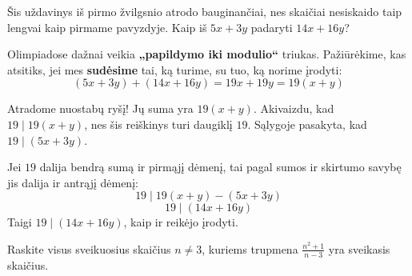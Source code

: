 \documentclass[11pt,a4paper]{scrartcl}
\begin{document}
\begin{solution}
Šis uždavinys iš pirmo žvilgsnio atrodo bauginančiai, nes skaičiai nesiskaido taip lengvai kaip pirmame pavyzdyje. Kaip iš \(5x + 3y\) padaryti \(14x + 16y\)? 

Olimpiadose dažnai veikia \textbf{„papildymo iki modulio“} triukas. 
Pažiūrėkime, kas atsitiks, jei mes \textbf{sudėsime} tai, ką turime, su tuo, ką norime įrodyti:
\begin{equation*} 
(5x + 3y) + (14x + 16y) = 19x + 19y = 19(x+y) 
\end{equation*}

Atradome nuostabų ryšį! Jų suma yra \(19(x+y)\). 
Akivaizdu, kad \(19 \mid 19(x+y)\), nes šis reiškinys turi daugiklį $19$.
Sąlygoje pasakyta, kad \(19 \mid (5x + 3y)\).

Jei $19$ dalija bendrą sumą ir pirmąjį dėmenį, tai pagal sumos ir skirtumo savybę jis dalija ir antrąjį dėmenį:
\begin{equation*} 
19 \mid 19(x+y) - (5x + 3y) 
\end{equation*}
\begin{equation*} 
19 \mid (14x + 16y) 
\end{equation*}
Taigi \(19\mid(14x+16y)\), kaip ir reikėjo įrodyti.
\end{solution}

\vspace{0.5cm}

\begin{example}
Raskite visus sveikuosius skaičius \(n \ne 3\), kuriems trupmena \(\frac{n^2 + 1}{n - 3}\) yra sveikasis skaičius.
\end{example}
\end{document}
